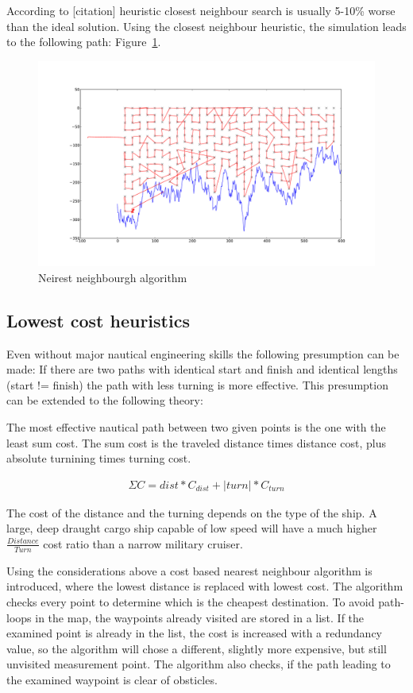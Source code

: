  According to [citation] heuristic closest neighbour search is usually 5-10\% worse than the ideal solution. Using the closest neighbour heuristic, the simulation leads to the following path: Figure~\ref{fig:nn}.

\begin{figure}[H]
	\centering
	\includegraphics[width=\textwidth]{img/nn}
	\caption{Neirest neighbourgh algorithm}
	\label{fig:nn}
\end{figure}

\subsection{Lowest cost heuristics}

Even without major nautical engineering skills the following presumption can be made: If there are two paths with identical start and finish and identical lengths (start != finish) the  path with less turning is more effective.
This presumption can be extended to the following theory:

The most effective nautical path between two given points is the one with the least sum cost. The sum cost is the traveled distance times distance cost, plus absolute turnining times turning cost.

\begin{align}
	\Sigma C  = dist*C_{dist} + |turn| * C_{turn}
\end{align}

The cost of the distance and the turning depends on the type of the ship. A large, deep draught cargo ship capable of low speed will have a much higher $\frac{Distance}{Turn}$ cost ratio than a narrow military cruiser.


Using the considerations above a cost based nearest neighbour algorithm is introduced, where the lowest distance is replaced with lowest cost. The algorithm checks every point to determine which is the cheapest destination. To avoid path-loops in the map, the waypoints already visited are stored in a list. If the examined point is already in the list, the cost is increased with a redundancy value, so the algorithm will chose a different, slightly more expensive, but still unvisited measurement point. The algorithm also checks, if the path leading to the examined waypoint is clear of obsticles.

